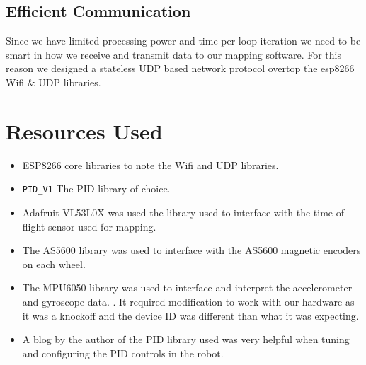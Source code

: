 \documentclass[12pt]{article}
\begin{document}
\subsection{Efficient Communication}
Since we have limited processing power and time per loop iteration we need to be smart in how we receive and transmit data to our mapping software. For this reason we designed a stateless UDP based network protocol overtop the esp8266 Wifi \& UDP libraries. \cite{wifi_lib}

\section{Resources Used}
\begin{itemize}
	\item ESP8266 core libraries to note the Wifi and UDP libraries. \cite{wifi_lib}
	\item \texttt{PID\_V1} The PID library of choice. \cite{pid_lib}
	\item Adafruit VL53L0X was used the library used to interface with the time of flight sensor used for mapping. \cite{dist_lib}
	\item The AS5600 library was used to interface with the AS5600 magnetic encoders on each wheel. \cite{enc_lib}
	\item The MPU6050 library was used to interface and interpret the accelerometer and gyroscope data. \cite{gyro_lib}. It required modification to work with our hardware as it was a knockoff and the device ID was different than what it was expecting.
	\item A blog by the author of the PID library used was very helpful when tuning and configuring the PID controls in the robot. \cite{pid_help}
\end{itemize}


\nocite{*}


\end{document}
